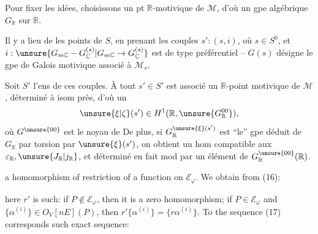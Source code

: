 Pour fixer les idées, choisissons un pt $\mathbb R$-motivique de $\mathcal M$, d'où un gpe algébrique $G_{\mathbb R}$ sur $\mathbb R$.

Il y a lieu de   les points  de $S$, en prenant les couples $s':(s,i)$, où $s\in S^0$, et
$i:\unsure{G_{m\mathbb C}-G^{(s)}_{\mathbb C}|G_{m\mathbb C}\to G^{(s)}_{\mathbb C}}$ est de type  préférentiel -- $G(s)$ désigne le gpe de Galois motivique associé à $\mathcal M_s$.

 Soit $S'$ l'ens de ces couples. À tout $s'\in S'$ est associé un $\mathbb R$-point motivique de $\mathcal M$,  déterminé à isom près, d'où un
\[
\unsure{\xi|\zeta}(s')\in H^1(\mathbb R,\unsure{G^{00}_{\mathbb R}}),
\]
où $G^{\unsure{00}}$ est le noyau de
De plus, si $G^{\unsure{\xi}(s')}_{\mathbb R}$ est ``le'' gpe déduit de $G_{\mathbb R}$ par torsion par $\unsure{\xi}(s')$, on obtient un hom
\diagram{\[
\begin{tikzcd}[column sep=large]
u(s'):\ G(s')_{\deleted{\unsure{\mathbb R}}\mathbb R}=G(s)_{\mathbb R} \arrow[r] & G^{\unsure{\xi}(s')}_{\mathbb R}
\end{tikzcd}
\]}
compatible aux $\varepsilon_{\mathbb R},\unsure{J_{\mathbb R}|j_{\mathbb R}}$, et déterminé en fait mod   par un élément de $G^{\unsure{00}}_{\mathbb R}(\mathbb R)$.



a homomorphism of restriction of a function on $\mathcal E_{\varphi}$. We obtain from (16):

here $r'$ is such: if $P\notin\mathcal E_{\varphi}$, then it is a zero homomorphism; if $P\in\mathcal E_{\varphi}$ and $\{\alpha^{(i)}\}\in O_V[nE](P)$, then $r'\{\alpha^{(i)}\}=\{r\alpha^{(i)}\}$. To the sequence (17) corresponds such exact sequence:

